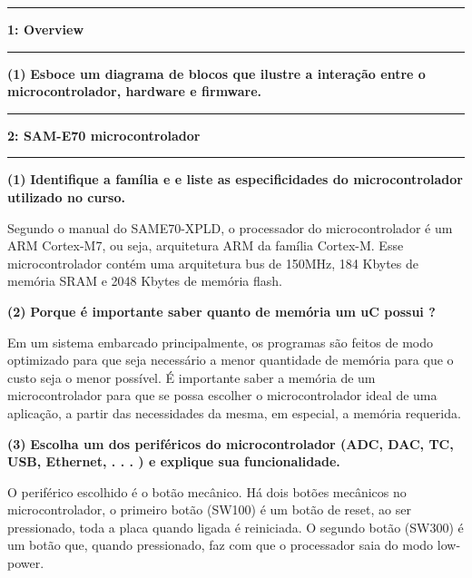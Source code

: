\documentclass[11pt]{article}
\newcommand\question[2]{\vspace{.25in}\hrule\textbf{#1: #2}\vspace{.5em}\hrule\vspace{.10in}}
\renewcommand\part[1]{\vspace{.10in}\textbf{(#1)}}
\newcommand\overview{\vspace{.10in}\textbf{Esboce um diagrama de blocos que ilustre a interação entre
		o microcontrolador, hardware e firmware.}}
\newcommand\microcontrolador{\vspace{.10in}\textbf{Identifique a família e e liste as especificidades do microcontrolador
		utilizado no curso.}}
\newcommand\memoriatwo{\vspace{.10in}\textbf{Porque é importante saber quanto de memória um uC possui
		?}}
\newcommand\perifericos{\vspace{.10in}\textbf{Escolha um dos periféricos do microcontrolador (ADC, DAC,
		TC, USB, Ethernet, . . . ) e explique sua funcionalidade.}}
\begin{document}
\raggedright
\newcommand\NAME{Marcelo G de Andrade}  %
\newcommand\HWNUM{1}              %


\question{1}{Overview}

\part{1} \overview


\RaggedRight 

\raggedright
\question{2}{SAM-E70 microcontrolador}

\part{1}
 \microcontrolador

\RaggedRight
Segundo o manual do SAME70-XPLD, o processador do microcontrolador é um ARM Cortex-M7, ou seja, arquitetura ARM da família Cortex-M. Esse microcontrolador contém uma arquitetura bus de 150MHz, 184 Kbytes de memória SRAM e 2048 Kbytes de memória flash. 

\raggedright
\part{2} 
\memoriatwo

\RaggedRight
Em um sistema embarcado principalmente, os programas são feitos de modo optimizado para que seja necessário a menor quantidade de memória para que o custo seja o menor possível. É importante saber a memória de um microcontrolador para que se possa escolher o microcontrolador ideal de uma aplicação, a partir das necessidades da mesma, em especial, a memória requerida.

\raggedright
\part{3}
\perifericos

\RaggedRight
O periférico escolhido é o botão mecânico. Há dois botões mecânicos no microcontrolador, o primeiro botão (SW100) é um botão de reset, ao ser pressionado, toda a placa quando ligada é reiniciada. O segundo botão (SW300) é um botão que, quando pressionado, faz com que o processador saia do modo low-power.
\end{document}

